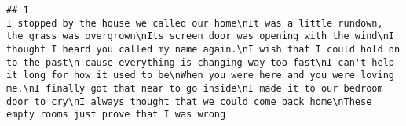 \documentclass[]{article}
\begin{document}
\begin{verbatim}
## 1                                                                                                                                                                                                                                                                                                                                                                                                                                                                                                                                                                                                                                                                                                                                                                                                                                                                                                                                                                                                                                                                                                                                                                                                                                                                                                                                                  I stopped by the house we called our home\nIt was a little rundown, the grass was overgrown\nIts screen door was opening with the wind\nI thought I heard you called my name again.\nI wish that I could hold on to the past\n'cause everything is changing way too fast\nI can't help it long for how it used to be\nWhen you were here and you were loving me.\nI finally got that near to go inside\nI made it to our bedroom door to cry\nI always thought that we could come back home\nThese empty rooms just prove that I was wrong

\end{verbatim}
\end{document}
